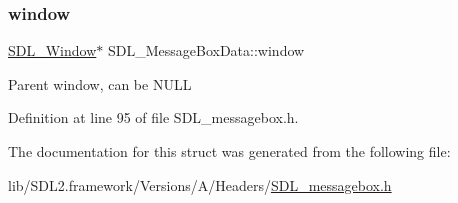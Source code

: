 \mbox{\label{struct_s_d_l___message_box_data_a5c333bc93705c66068e140bc28daedcb}} 
\subsubsection{\texorpdfstring{window}{window}}
{\footnotesize\ttfamily \mbox{\hyperlink{_s_d_l__video_8h_a55a196c7d3b8497538632c79ae1e6392}{S\+D\+L\+\_\+\+Window}}$\ast$ S\+D\+L\+\_\+\+Message\+Box\+Data\+::window}

Parent window, can be N\+U\+LL 

Definition at line 95 of file S\+D\+L\+\_\+messagebox.\+h.



The documentation for this struct was generated from the following file\+:\begin{DoxyCompactItemize}
\item 
lib/\+S\+D\+L2.\+framework/\+Versions/\+A/\+Headers/\mbox{\hyperlink{_s_d_l__messagebox_8h}{S\+D\+L\+\_\+messagebox.\+h}}\end{DoxyCompactItemize}
